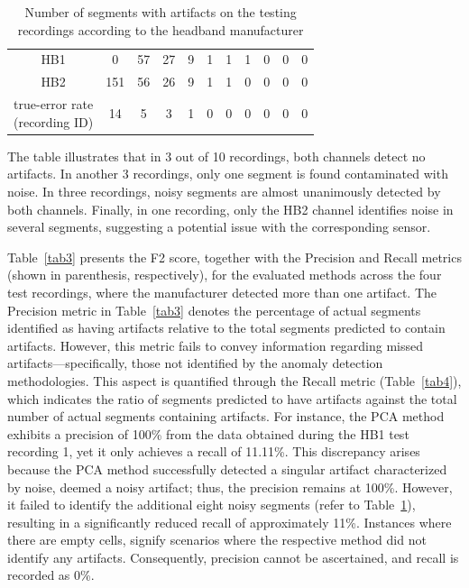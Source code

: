 \documentclass[conference]{IEEEtran}
\begin{document}
\begin{table}[bt]
\caption{Number of segments with artifacts on the testing recordings according to the headband manufacturer}
    \centering
    \renewcommand{\arraystretch}{1.3} %
    \begin{tabular}{c|c|c|c|c|c|c|c|c|c|c}
        \hline
        HB1 & 0 & 57 & 27 & 9 & 1 & 1 & 1 & 0 & 0 & 0 \\
        HB2 & 151 & 56 & 26 & 9 & 1 & 1 & 0 & 0 & 0 & 0 \\
        \hline
        \parbox[c][1cm][c]{2cm}{true-error rate\\(recording ID)} & 14 & 5 & 3 & 1 & 0 & 0 & 0 & 0 & 0 & 0 \\                
        \hline
    \end{tabular}
    \label{tab2}
\end{table}

The table illustrates that in 3 out of 10 recordings, both channels detect no artifacts. In another 3 recordings, only one segment is found contaminated with noise. In three recordings, noisy segments are almost unanimously detected by both channels. Finally, in one recording, only the HB2 channel identifies noise in several segments, suggesting a potential issue with the corresponding sensor.





Table~\ref{tab3} presents the F2 score, together with the Precision and Recall metrics (shown in parenthesis, respectively), for the evaluated methods across the four test recordings, where the manufacturer detected more than one artifact.
The Precision metric in Table~\ref{tab3} denotes the percentage of
actual segments identified as having artifacts relative to the total
segments predicted to contain artifacts. However, this metric fails to
convey information regarding missed artifacts---specifically, those not
identified by the anomaly detection methodologies. This aspect is
quantified through the Recall metric (Table~\ref{tab4}), which
indicates the ratio of segments predicted to have artifacts against
the total number of actual segments containing artifacts. For
instance, the PCA method exhibits a precision of 100\% from the data
obtained during the HB1 test recording 1, yet it only achieves a
recall of 11.11\%. This discrepancy arises because the PCA method
successfully detected a singular artifact characterized by noise,
deemed a noisy artifact; thus, the precision remains at
100\%. However, it failed to identify the additional eight noisy
segments (refer to Table~\ref{tab2}), resulting in a significantly
reduced recall of approximately 11\%. Instances where there are empty
cells, signify scenarios where the respective method did not identify
any artifacts. Consequently, precision cannot be ascertained, and
recall is recorded as 0\%.
\end{document}
